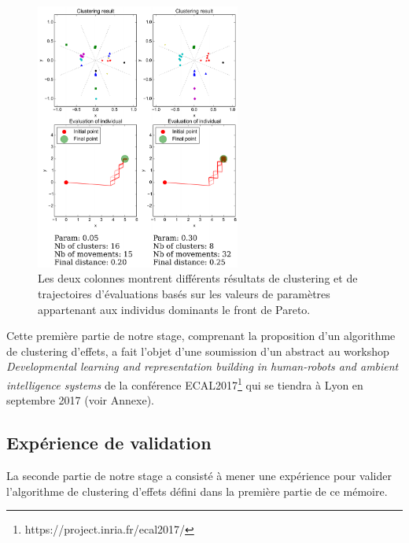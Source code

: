 \documentclass{llncs}
\begin{document}
\begin{figure}[ht]
  \begin{center}
    \includegraphics[width=0.6\textwidth]{figures/Benchmark_3.pdf}
    \caption{Les deux colonnes montrent différents résultats de clustering et de trajectoires d'évaluations basés sur les valeurs de paramètres appartenant aux individus dominants le front de Pareto.}
    \label{fig:results}
  \end{center}
\end{figure}



Cette première partie de notre stage, comprenant la proposition d'un algorithme de clustering d'effets, a fait l'objet d'une soumission d'un abstract au workshop \textit{Developmental learning and representation building in human-robots and ambient intelligence systems} de la conférence ECAL2017\footnote{https://project.inria.fr/ecal2017/} qui se tiendra à Lyon en septembre 2017 (voir Annexe).






\subsection{Expérience de validation}

La seconde partie de notre stage a consisté à mener une expérience pour valider l'algorithme de clustering d'effets défini dans la première partie de ce mémoire.
\end{document}
